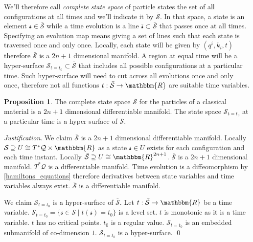 \documentclass[aps,pra,10pt,twocolumn,floatfix,nofootinbib]{revtex4-1}
\numberwithin{equation}{section}
\theoremstyle{definition}
\newtheorem{prop}[equation]{Proposition}
\newenvironment{justification}{\emph{Justification}.}{\qed}
\begin{document}
We'll therefore call \emph{complete state space} of particle states the set of all configurations at all times and we'll indicate it by $\bar{\mathcal{S}}$. In that space, a state is an element $\mathcal{s} \in \bar{\mathcal{S}}$ while a time evolution is a line $\bar{\mathcal{s}} \subset \bar{\mathcal{S}}$ that passes once at all times. Specifying an evolution map means giving a set of lines such that each state is traversed once and only once. Locally, each state will be given by $(q^i, k_i, t)$ therefore $\bar{\mathcal{S}}$ is a $2n+1$ dimensional manifold. A region at equal time will be a hyper-surface $\mathcal{S}_{t=t_0} \subset \bar{\mathcal{S}}$ that includes all possible configurations at a particular time. Such hyper-surface will need to cut across all evolutions once and only once, therefore not all functions $t : \bar{\mathcal{S}} \rightarrow \mathbbm{R}$ are suitable time variables.

\begin{prop}\label{complete_particle_state_space}
	The complete state space $\bar{\mathcal{S}}$ for the particles of a classical material is a $2n+1$ dimensional differentiable manifold. The state space $\mathcal{S}_{t=t_0}$ at a particular time is a hyper-surface of $\bar{\mathcal{S}}$.
\end{prop}

\begin{justification}
	We claim $\bar{\mathcal{S}}$ is a $2n+1$ dimensional differentiable manifold. Locally $\bar{\mathcal{S}} \supseteq U \cong T^*\mathcal{Q}\times \mathbbm{R}$ as a state $\mathcal{s} \in U$ exists for each configuration and each time instant. Locally $\bar{\mathcal{S}} \supseteq U \cong\mathbbm{R}^{2n+1}$. $\bar{\mathcal{S}}$ is a $2n+1$ dimensional manifold. $T^*\mathcal{Q}$ is a differentiable manifold. Time evolution is a diffeomorphism by \ref{hamiltons_equations} therefore derivatives between state variables and time variables always exist. $\bar{\mathcal{S}}$ is a differentiable manifold.
	
	We claim $\mathcal{S}_{t=t_0}$ is a hyper-surface of $\bar{\mathcal{S}}$. Let $t : \bar{\mathcal{S}} \rightarrow \mathbbm{R}$ be a time variable. $\mathcal{S}_{t=t_0} = \{ \mathcal{s} \in \bar{\mathcal{S}} \; | \; t(\mathcal{s}) = t_0 \}$ is a level set. $t$ is monotonic as it is a time variable. $t$ has no critical points. $t_0$ is a regular value. $\mathcal{S}_{t=t_0}$ is an embedded submanifold of co-dimension $1$. $\mathcal{S}_{t=t_0}$ is a hyper-surface.
\end{justification}
\end{document}
